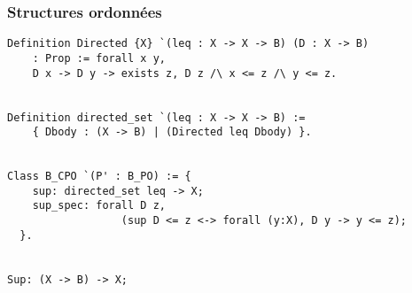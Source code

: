 \documentclass{beamer}
\begin{document}
\begin{frame}[fragile]
\frametitle{Structures ordonnées}



\begin{lstlisting}[frame=single, language = Coq, basicstyle=\scriptsize]
Definition Directed {X} `(leq : X -> X -> B) (D : X -> B) 
	: Prop := forall x y, 
	D x -> D y -> exists z, D z /\ x <= z /\ y <= z.


Definition directed_set `(leq : X -> X -> B) :=
	{ Dbody : (X -> B) | (Directed leq Dbody) }.


Class B_CPO `(P' : B_PO) := {
    sup: directed_set leq -> X;
    sup_spec: forall D z, 
    			  (sup D <= z <-> forall (y:X), D y -> y <= z);
  }.


Sup: (X -> B) -> X;
\end{lstlisting}


\end{frame}












\end{document}
